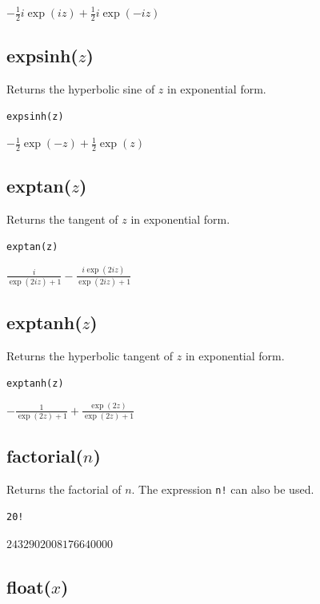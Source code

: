 \documentclass[12pt]{article}
\begin{document}
$\displaystyle -\tfrac{1}{2}i\exp(iz)+\tfrac{1}{2}i\exp(-iz)$

\subsection*{expsinh($z$)}

Returns the hyperbolic sine of $z$ in exponential form.

{\color{blue}
\begin{verbatim}
expsinh(z)
\end{verbatim}
}

$\displaystyle -\tfrac{1}{2}\exp(-z)+\tfrac{1}{2}\exp(z)$

\subsection*{exptan($z$)}

Returns the tangent of $z$ in exponential form.

{\color{blue}
\begin{verbatim}
exptan(z)
\end{verbatim}
}

$\displaystyle \frac{i}{\exp(2iz)+1}-\frac{i\exp(2iz)}{\exp(2iz)+1}$

\subsection*{exptanh($z$)}

Returns the hyperbolic tangent of $z$ in exponential form.

{\color{blue}
\begin{verbatim}
exptanh(z)
\end{verbatim}
}

$\displaystyle -\frac{1}{\exp(2z)+1}+\frac{\exp(2z)}{\exp(2z)+1}$

\subsection*{factorial($n$)}

Returns the factorial of $n$.
The expression {\tt n!} can also be used.

{\color{blue}
\begin{verbatim}
20!
\end{verbatim}
}

$2432902008176640000$

\subsection*{float($x$)}
\end{document}
